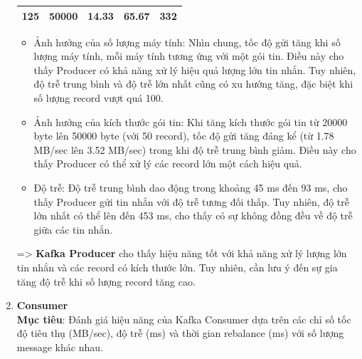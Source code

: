 \begin{enumerate}
\begin{longtable}{|p{}|p{}|p{}|p{}|p{}|}
            \hline
            125 & 50000 & 14.33 & 65.67 & 332\\
            \hline
        \end{longtable}
        \begin{itemize}[label=--]
            \item  Ảnh hưởng của số lượng máy tính: Nhìn chung, tốc độ gửi tăng khi số lượng máy tính, mỗi máy tính tương ứng với một gói tin. Điều này cho thấy Producer có khả năng xử lý hiệu quả lượng lớn tin nhắn. Tuy nhiên, độ trễ trung bình và độ trễ lớn nhất cũng có xu hướng tăng, đặc biệt khi số lượng record vượt quá 100.
            \item Ảnh hưởng của kích thước gói tin: Khi tăng kích thước gói tin từ 20000 byte lên 50000 byte (với 50 record), tốc độ gửi tăng đáng kể (từ 1.78 MB/sec lên 3.52 MB/sec) trong khi độ trễ trung bình giảm. Điều này cho thấy Producer có thể xử lý các record lớn một cách hiệu quả.
            \item Độ trễ: Độ trễ trung bình dao động trong khoảng 45 ms đến 93 ms, cho thấy Producer gửi tin nhắn với độ trễ tương đối thấp. Tuy nhiên, độ trễ lớn nhất có thể lên đến 453 ms, cho thấy có sự không đồng đều về độ trễ giữa các tin nhắn.
        \end{itemize}
        => \textbf{Kafka Producer} cho thấy hiệu năng tốt với khả năng xử lý lượng lớn tin nhắn và các record có kích thước lớn. Tuy nhiên, cần lưu ý đến sự gia tăng độ trễ khi số lượng record tăng cao.
    \item \textbf{Consumer}\\
        \textbf{Mục tiêu}: Đánh giá hiệu năng của Kafka Consumer dựa trên các chỉ số tốc độ tiêu thụ (MB/sec), độ trễ (ms) và thời gian rebalance (ms) với số lượng message khác nhau.
    

\end{enumerate}
